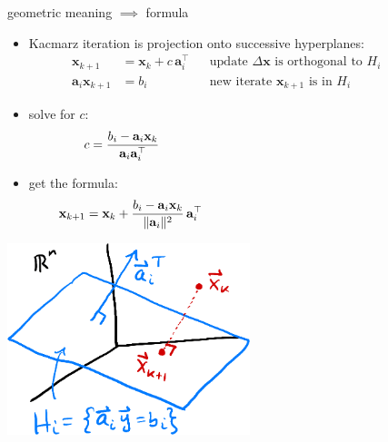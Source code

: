 \documentclass[usepdftitle=false,usenames,dvipsnames]{beamer}
\newcommand{\ba}{\mathbf{a}}
\newcommand{\bx}{\mathbf{x}}
\begin{document}
\begin{frame}{geometric meaning $\implies$ formula}

\begin{itemize}
\item Kacmarz iteration is projection onto successive hyperplanes:
\begin{align*}
\bx_{k+1} &= \bx_k + c\, \ba_i^\top & &\text{update $\Delta\bx$ is orthogonal to $H_i$} \phantom{sladkjf} \\
\ba_i \bx_{k+1} &= b_i            & &\text{new iterate $\bx_{k+1}$ is in $H_i$}
\end{align*}
\item solve for $c$:
    $$c = \frac{b_i - \ba_i \bx_k}{\ba_i \ba_i^\top} \hspace{70mm}$$
\item get the formula:
    $$\bx_{k+1} = \bx_k + \frac{b_i - \ba_i \bx_k}{\|\ba_i\|^2}\, \ba_i^\top \hspace{65mm}$$
\end{itemize}

\vspace{-40mm}
\hfill \includegraphics[width=0.53\textwidth]{figs/hyperproj.png}
\end{frame}
\end{document}
